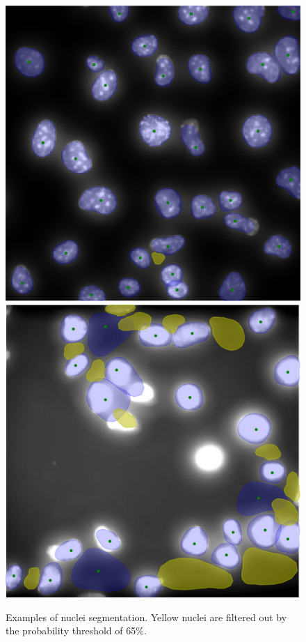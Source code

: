 \documentclass[9pt,conference,compsocconf, article]{IEEEtran}
\begin{document}
\begin{figure}[h!]
    \centering
    
        \includegraphics[width=0.45\linewidth]{images/NucSeg1.png}
        \includegraphics[width=0.45\linewidth]{images/Nuc_seg.PNG}
    \caption{
    Examples of nuclei segmentation. Yellow nuclei are filtered out by the probability threshold of 65\%.
    }
    \label{fig:seg_nuc}
\end{figure}
\end{document}
